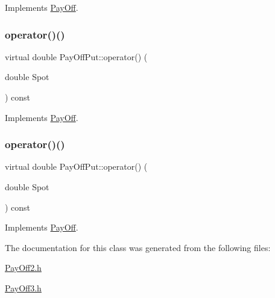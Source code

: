 Implements \hyperlink{classPayOff_ad8194d5b82247ae89c25c515f0ba806a}{Pay\+Off}.

\hypertarget{classPayOffPut_a6dc8b470aaa1544814cfdf6bbed273df}{}\label{classPayOffPut_a6dc8b470aaa1544814cfdf6bbed273df} 
\subsubsection{\texorpdfstring{operator()()}{operator()()}\hspace{0.1cm}{\footnotesize\ttfamily [1/2]}}
{\footnotesize\ttfamily virtual double Pay\+Off\+Put\+::operator() (\begin{DoxyParamCaption}\item[{double}]{Spot }\end{DoxyParamCaption}) const\hspace{0.3cm}{\ttfamily [virtual]}}



Implements \hyperlink{classPayOff_a5ae17d82c233ef5568c8fb0539703000}{Pay\+Off}.

\hypertarget{classPayOffPut_a6dc8b470aaa1544814cfdf6bbed273df}{}\label{classPayOffPut_a6dc8b470aaa1544814cfdf6bbed273df} 
\subsubsection{\texorpdfstring{operator()()}{operator()()}\hspace{0.1cm}{\footnotesize\ttfamily [2/2]}}
{\footnotesize\ttfamily virtual double Pay\+Off\+Put\+::operator() (\begin{DoxyParamCaption}\item[{double}]{Spot }\end{DoxyParamCaption}) const\hspace{0.3cm}{\ttfamily [virtual]}}



Implements \hyperlink{classPayOff_a5ae17d82c233ef5568c8fb0539703000}{Pay\+Off}.



The documentation for this class was generated from the following files\+:\begin{DoxyCompactItemize}
\item 
\hyperlink{PayOff2_8h}{Pay\+Off2.\+h}\item 
\hyperlink{PayOff3_8h}{Pay\+Off3.\+h}\end{DoxyCompactItemize}
